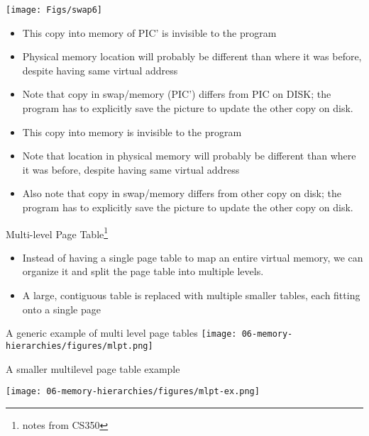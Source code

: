 \newpage
\begin{frame}[fragile]
\centerline{\texttt{[image: Figs/swap6]}}
\begin{itemize}
\item This copy into memory of PIC' is invisible to the program
\item Physical memory location will probably be different than where it was before, despite having same virtual address 
\item Note that copy in swap/memory (PIC') differs from PIC on DISK; the program has to explicitly save the picture to update the other copy on disk.
\end{itemize}
\BNotes\ifnum{}
\begin{itemize}
\item This copy into memory is invisible to the program
\item Note that location in physical memory will probably be different than where it was before, despite having same virtual address 
\item Also note that copy in swap/memory differs from other copy on disk; the program has to explicitly save the picture to update the other copy on disk.
\end{itemize}
\fi\ENotes
\end{frame}


\begin{frame}{Multi-level Page Table\footnote{notes from CS350}}
    \begin{itemize}
        \item Instead of having a single page table to map an entire virtual memory, we can organize it and split the page table into multiple levels.
        \item A large, contiguous table is replaced with multiple smaller tables, each fitting onto a single page   
    \end{itemize}
    
\end{frame}

\newpage
\begin{frame}{A generic example of multi level page tables}
    \texttt{[image: 06-memory-hierarchies/figures/mlpt.png]}

\end{frame}


\begin{frame}{A smaller multilevel page table example}
    
\texttt{[image: 06-memory-hierarchies/figures/mlpt-ex.png]}
\end{frame}


